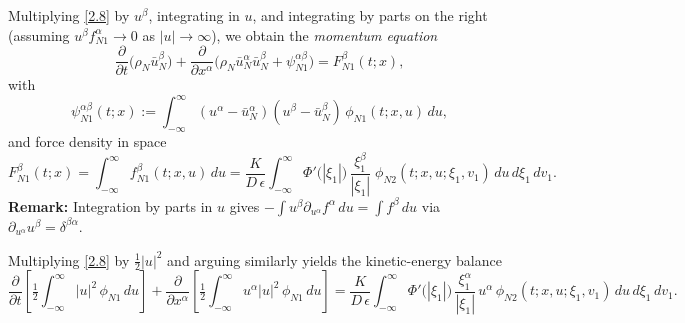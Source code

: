 \documentclass[11pt]{article}
\begin{document}
Multiplying \eqref{2.8} by $u^\beta$, integrating in $u$, and integrating by parts on the right (assuming $u^\beta f_{N1}^\alpha\!\to 0$ as $|u|\to\infty$), we obtain the \emph{momentum equation}
\begin{equation*}\label{2.10}
\frac{\partial}{\partial t}\big(\rho_N\bar u_N^\beta\big)
+\frac{\partial}{\partial x^\alpha}
\big(\rho_N\bar u_N^\alpha \bar u_N^\beta+\psi_{N1}^{\alpha\beta}\big)
=F_{N1}^\beta(t;x),
\tag{2.10}
\end{equation*}
with
\[
\psi_{N1}^{\alpha\beta}(t;x):=\int_{-\infty}^{\infty}(u^\alpha-\bar u_N^\alpha)(u^\beta-\bar u_N^\beta)\,\phi_{N1}(t;x,u)\,du,
\]
and force density in space
\[
F_{N1}^\beta(t;x)=\int_{-\infty}^{\infty} f_{N1}^\beta(t;x,u)\,du
=
\frac{K}{D\,\epsilon}
\int_{-\infty}^{\infty}\Phi'\big(|\xi_1|\big)\,\frac{\xi_1^\beta}{|\xi_1|}
\;\phi_{N2}(t;x,u;\xi_1,v_1)\,du\,d\xi_1\,dv_1.
\]
\textbf{Remark:} Integration by parts in $u$ gives $-\!\int u^\beta \partial_{u^\alpha}f^\alpha\,du=\int f^\beta\,du$ via $\partial_{u^\alpha}u^\beta=\delta^{\beta\alpha}$.



Multiplying \eqref{2.8} by $\tfrac12|u|^2$ and arguing similarly yields the kinetic-energy balance
\begin{equation*}\label{2.11}
\frac{\partial}{\partial t}\!\left[\tfrac12\int_{-\infty}^{\infty}|u|^2\,\phi_{N1}\,du\right]
+
\frac{\partial}{\partial x^\alpha}\!\left[\tfrac12\int_{-\infty}^{\infty}u^\alpha |u|^2\,\phi_{N1}\,du\right]
=
\frac{K}{D\,\epsilon}
\int_{-\infty}^{\infty}
\Phi'\big(|\xi_1|\big)\,\frac{\xi_1^\alpha}{|\xi_1|}\,
u^\alpha \,\phi_{N2}(t;x,u;\xi_1,v_1)\,du\,d\xi_1\,dv_1.
\tag{2.11}
\end{equation*}
\end{document}
